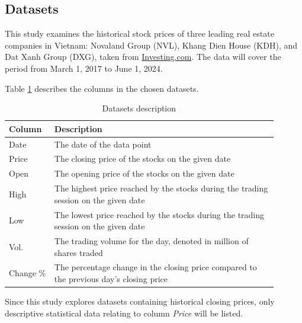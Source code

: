 \documentclass[conference]{IEEEtran}
\begin{document}
\subsection{Datasets}
This study examines the historical stock prices of three leading real estate companies in Vietnam: Novaland Group (NVL), Khang Dien House (KDH), and Dat Xanh Group (DXG), taken from \href{https://www.investing.com/}{Investing.com}. The data will cover the period from March 1, 2017 to June 1, 2024. \par
Table \ref{tb_description} describes the columns in the chosen datasets.
\begin{table}[H]
\caption{Datasets description}
\label{tb_description}
    \begin{tabular}{|>{\centering\arraybackslash}p{0.15\linewidth}|>{\centering\arraybackslash}p{0.75\linewidth}|}
        \hline
            \rowcolor{customtransparent} \textbf{Column} & \textbf{Description} \\ \hline
        Date & The date of the data point\\ \hline
        Price & The closing price of the stocks on the given date\\ \hline
        Open & The opening price of the stocks on the given date\\ \hline
        High & The highest price reached by the stocks during the trading session on the given date\\ \hline
        Low & The lowest price reached by the stocks during the trading session on the given date\\ \hline
        Vol. & The trading volume for the day, denoted in million of shares traded\\ \hline
        Change \% & The percentage change in the closing price compared to the previous day's closing price\\\hline
    \end{tabular}
\end{table}
Since this study explores datasets containing historical closing prices, only descriptive statistical data relating to column \textit{Price} will be listed.
\end{document}
